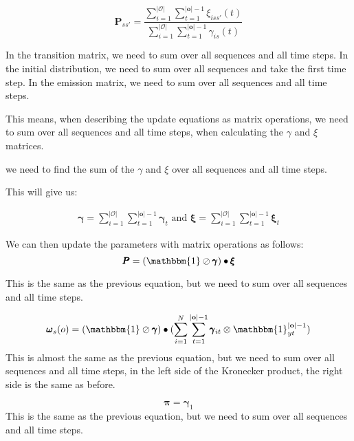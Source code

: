 \begin{equation}
    \pmb{P}_{s s'} = \frac{\sum_{i=1}^{|\mathcal{O}|} \sum_{t = 1}^{|\mathbf{o}|-1} \xi_{iss'}(t)}{\sum_{i=1}^{|\mathcal{O}|} \sum_{t = 1}^{|\mathbf{o}|-1} \gamma_{is}(t)}
\end{equation}

In the transition matrix, we need to sum over all sequences and all time steps.
In the initial distribution, we need to sum over all sequences and take the first time step.
In the emission matrix, we need to sum over all sequences and all time steps.

This means, when describing the update equations as matrix operations, we need to sum over all sequences and all time steps, when calculating the $\gamma$ and $\xi$ matrices.

we need to find the sum of the $\gamma$ and $\xi$ over all sequences and all time steps.

This will give us:

\begin{align}
    \pmb{\gamma} = \sum_{i=1}^{|\mathcal{O}|}\sum_{t=1}^{|\mathbf{o}|-1} \pmb{\gamma}_t
    \text{ and }
    \pmb{\xi} = \sum_{i=1}^{|\mathcal{O}|}\sum_{t=1}^{|\mathbf{o}|-1} \pmb{\xi}_t
\end{align}

We can then update the parameters with matrix operations as follows:
\begin{equation}
    \pmb{P}
    = (\mathbbm{1} \oslash \pmb{\gamma}) \bullet \pmb{\xi}
    \label{eq:transition-probabilities-update}
\end{equation}

This is the same as the previous equation, but we need to sum over all sequences and all time steps.

\begin{equation}
    \pmb{\omega}
    _s(o) = (\mathbbm{1} \oslash \pmb{\gamma}) \bullet (\sum_{i=1}^N \sum_{t=1}^{|\mathbf{o}|-1} \pmb{\gamma}_{it} \otimes \mathbbm{1}_{yt}^{|\mathbf{o}|-1})
    \label{eq:omega-update}
\end{equation}
This is almost the same as the previous equation, but we need to sum over all sequences and all time steps, in the left side of the Kronecker product, the right side is the same as before.

\begin{equation}
    \pmb{\pi}
    = \pmb{\gamma}_1
    \label{eq:initial-probabilities-update}
\end{equation}
This is the same as the previous equation, but we need to sum over all sequences and all time steps.


